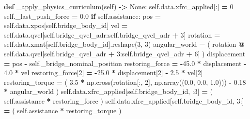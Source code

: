 \documentclass[
  chinese,
  11pt,
  letterpaper,
]{article}
\newenvironment{Shaded}{\begin{snugshade}}{\end{snugshade}}
\newcommand{\ControlFlowTok}[1]{\textcolor[rgb]{0.13,0.29,0.53}{\textbf{#1}}}
\newcommand{\DecValTok}[1]{\textcolor[rgb]{0.00,0.00,0.81}{#1}}
\newcommand{\FloatTok}[1]{\textcolor[rgb]{0.00,0.00,0.81}{#1}}
\newcommand{\KeywordTok}[1]{\textcolor[rgb]{0.13,0.29,0.53}{\textbf{#1}}}
\newcommand{\NormalTok}[1]{#1}
\newcommand{\OperatorTok}[1]{\textcolor[rgb]{0.81,0.36,0.00}{\textbf{#1}}}
\newcommand{\VariableTok}[1]{\textcolor[rgb]{0.00,0.00,0.00}{#1}}
\renewenvironment{Shaded}{\par\smallskip}{\par\smallskip}
\begin{document}
\begin{Shaded}
\begin{Highlighting}[]
    \KeywordTok{def}\NormalTok{ \_apply\_physics\_curriculum(}\VariableTok{self}\NormalTok{) }\OperatorTok{{-}\textgreater{}} \VariableTok{None}\NormalTok{:}
        \VariableTok{self}\NormalTok{.data.xfrc\_applied[:] }\OperatorTok{=} \DecValTok{0}
        \VariableTok{self}\NormalTok{.\_last\_push\_force }\OperatorTok{=} \FloatTok{0.0}
        \ControlFlowTok{if} \VariableTok{self}\NormalTok{.assistance:}
\NormalTok{            pos }\OperatorTok{=} \VariableTok{self}\NormalTok{.data.xpos[}\VariableTok{self}\NormalTok{.bridge\_body\_id]}
\NormalTok{            vel }\OperatorTok{=} \VariableTok{self}\NormalTok{.data.qvel[}\VariableTok{self}\NormalTok{.bridge\_qvel\_adr:}\VariableTok{self}\NormalTok{.bridge\_qvel\_adr }\OperatorTok{+} \DecValTok{3}\NormalTok{]}
\NormalTok{            rotation }\OperatorTok{=} \VariableTok{self}\NormalTok{.data.xmat[}\VariableTok{self}\NormalTok{.bridge\_body\_id].reshape(}\DecValTok{3}\NormalTok{, }\DecValTok{3}\NormalTok{)}
\NormalTok{            angular\_world }\OperatorTok{=}\NormalTok{ (}
\NormalTok{                rotation}
                \OperatorTok{@} \VariableTok{self}\NormalTok{.data.qvel[}\VariableTok{self}\NormalTok{.bridge\_qvel\_adr }\OperatorTok{+} \DecValTok{3}\NormalTok{:}\VariableTok{self}\NormalTok{.bridge\_qvel\_adr }\OperatorTok{+} \DecValTok{6}\NormalTok{]}
\NormalTok{            )}
\NormalTok{            displacement }\OperatorTok{=}\NormalTok{ pos }\OperatorTok{{-}} \VariableTok{self}\NormalTok{.\_bridge\_nominal\_position}
\NormalTok{            restoring\_force }\OperatorTok{=} \OperatorTok{{-}}\FloatTok{45.0} \OperatorTok{*}\NormalTok{ displacement }\OperatorTok{{-}} \FloatTok{4.0} \OperatorTok{*}\NormalTok{ vel}
\NormalTok{            restoring\_force[}\DecValTok{2}\NormalTok{] }\OperatorTok{=} \OperatorTok{{-}}\FloatTok{25.0} \OperatorTok{*}\NormalTok{ displacement[}\DecValTok{2}\NormalTok{] }\OperatorTok{{-}} \FloatTok{2.5} \OperatorTok{*}\NormalTok{ vel[}\DecValTok{2}\NormalTok{]}
\NormalTok{            restoring\_torque }\OperatorTok{=}\NormalTok{ (}
                \FloatTok{3.5} \OperatorTok{*}\NormalTok{ np.cross(rotation[:, }\DecValTok{2}\NormalTok{], np.array((}\FloatTok{0.0}\NormalTok{, }\FloatTok{0.0}\NormalTok{, }\FloatTok{1.0}\NormalTok{)))}
                \OperatorTok{{-}} \FloatTok{0.18} \OperatorTok{*}\NormalTok{ angular\_world}
\NormalTok{            )}
            \VariableTok{self}\NormalTok{.data.xfrc\_applied[}\VariableTok{self}\NormalTok{.bridge\_body\_id, :}\DecValTok{3}\NormalTok{] }\OperatorTok{=}\NormalTok{ (}
                \VariableTok{self}\NormalTok{.assistance }\OperatorTok{*}\NormalTok{ restoring\_force}
\NormalTok{            )}
            \VariableTok{self}\NormalTok{.data.xfrc\_applied[}\VariableTok{self}\NormalTok{.bridge\_body\_id, }\DecValTok{3}\NormalTok{:] }\OperatorTok{=}\NormalTok{ (}
                \VariableTok{self}\NormalTok{.assistance }\OperatorTok{*}\NormalTok{ restoring\_torque}
\NormalTok{            )}


\end{Highlighting}
\end{Shaded}
\end{document}
